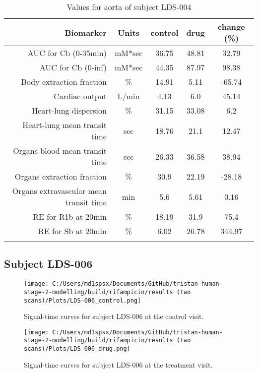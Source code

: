 \documentclass{epflreport}%
\begin{document}
\begin{longtable}{rcccc}%
\hline%
Biomarker&Units&control&drug&change (\%)\\%
\hline%
AUC for Cb (0{-}35min)&mM*sec&36.75&48.81&32.79\\%
AUC for Cb (0{-}inf)&mM*sec&44.35&87.97&98.38\\%
Body extraction fraction&\%&14.91&5.11&{-}65.74\\%
Cardiac output&L/min&4.13&6.0&45.14\\%
Heart{-}lung dispersion&\%&31.15&33.08&6.2\\%
Heart{-}lung mean transit time&sec&18.76&21.1&12.47\\%
Organs blood mean transit time&sec&26.33&36.58&38.94\\%
Organs extraction fraction&\%&30.9&22.19&{-}28.18\\%
Organs extravascular mean transit time&min&5.6&5.61&0.16\\%
RE for R1b at 20min&\%&18.19&31.9&75.4\\%
RE for Sb at 20min&\%&6.02&26.78&344.97\\%
\hline%
\caption{Values for aorta of subject LDS-004} \\%
\end{longtable}%
\clearpage%
\subsection{Subject LDS{-}006}%
\label{subsec:SubjectLDS{-}006}%

%


\begin{figure}[h!]%
\centering%
\texttt{[image: C:/Users/md1spsx/Documents/GitHub/tristan-human-stage-2-modelling/build/rifampicin/results (two scans)/Plots/LDS-006\_control.png]}%
\caption{Signal{-}time curves for subject LDS{-}006 at the control visit.}%
\end{figure}

%


\begin{figure}[h!]%
\centering%
\texttt{[image: C:/Users/md1spsx/Documents/GitHub/tristan-human-stage-2-modelling/build/rifampicin/results (two scans)/Plots/LDS-006\_drug.png]}%
\caption{Signal{-}time curves for subject LDS{-}006 at the treatment visit.}%
\end{figure}
\end{document}
